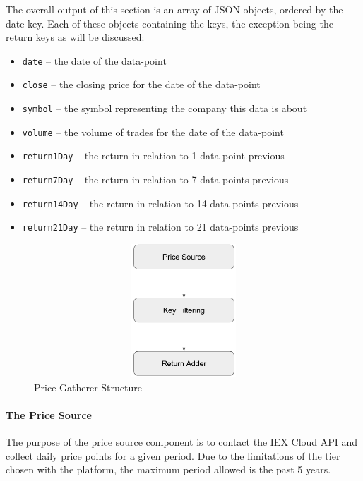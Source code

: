 The overall output of this section is an array of JSON objects, ordered by the date key. Each of these objects containing the keys, the exception being the return keys as will be discussed:
\begin{itemize}
    \item \texttt{date} -- the date of the data-point
    \item \texttt{close} -- the closing price for the date of the data-point
    \item \texttt{symbol} -- the symbol representing the company this data is about
    \item \texttt{volume} -- the volume of trades for the date of the data-point
    \item \texttt{return1Day} -- the return in relation to 1 data-point previous
    \item \texttt{return7Day} -- the return in relation to 7 data-points previous
    \item \texttt{return14Day} -- the return in relation to 14 data-points previous
    \item \texttt{return21Day} -- the return in relation to 21 data-points previous
\end{itemize}

\begin{figure}[h!]
    \centering
    \includegraphics[width=15cm,height=5cm,keepaspectratio]{design/PriceGathererStructure.png}
    \caption{Price Gatherer Structure}
    \label{fig:pricegathererstructure}
\end{figure}

\paragraph{The Price Source}

The purpose of the price source component is to contact the IEX Cloud API and collect daily price points for a given period. Due to the limitations of the tier chosen with the platform, the maximum period allowed is the past 5 years.

